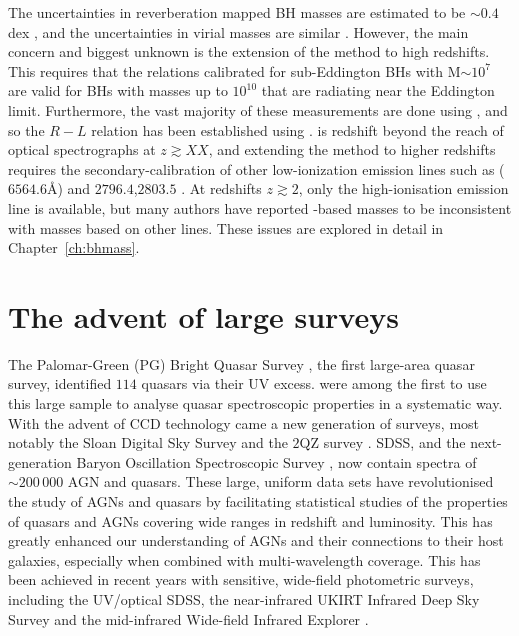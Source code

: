 The uncertainties in reverberation mapped BH masses are estimated to be $\sim 0.4$ dex \citep[e.g.][]{peterson10}, and the uncertainties in virial masses are similar \citep[e.g.][]{vestergaard06}.
However, the main concern and biggest unknown is the extension of the method to high redshifts. 
This requires that the relations calibrated for sub-Eddington BHs with M$\sim10^7$ are valid for BHs with masses up to $10^{10}$ that are radiating near the Eddington limit. 
Furthermore, the vast majority of these measurements are done using \hbns, and so the $R-L$ relation has been established using \hbns.
\hb is redshift beyond the reach of optical spectrographs at $z \gtrsim XX$, and extending the method to higher redshifts requires the secondary-calibration of other low-ionization emission lines such as \ha ($6564.6$\AA) and \ll$2796.4$,$2803.5$ \citep[e.g.][]{vestergaard02,mclure02,wu04,kollmeier06,onken08,wang09,rafiee11}.
At redshifts $z \gtrsim 2$, only the high-ionisation  emission line is available, but many authors have reported -based masses to be inconsistent with masses based on other lines. 
These issues are explored in detail in Chapter~\ref{ch:bhmass}.

\section{The advent of large surveys}

The Palomar-Green (PG) Bright Quasar Survey \citep[BQS;][]{schmidt83}, the first large-area quasar survey, identified $114$ quasars via their UV excess. 
\citet{boroson92} were among the first to use this large sample to analyse quasar spectroscopic properties in a systematic way.
With the advent of CCD technology came a new generation of surveys, most notably the Sloan Digital Sky Survey \citep[SDSS;][]{york00} and the $2$QZ survey \citep{croom04}. 
SDSS, and the next-generation Baryon Oscillation Spectroscopic Survey \citep[BOSS;][]{dawson13}, now contain spectra of $\sim200\,000$ AGN and quasars. 
These large, uniform data sets have revolutionised the study of AGNs and quasars by facilitating statistical studies of the properties of quasars and AGNs covering wide ranges in redshift and luminosity. 
This has greatly enhanced our understanding of AGNs and their connections to their host galaxies, especially when combined with multi-wavelength coverage. 
This has been achieved in recent years with sensitive, wide-field photometric surveys, including the UV/optical SDSS, the near-infrared UKIRT Infrared Deep Sky Survey \citep[UKIDSS;][]{lawrence07} and the mid-infrared Wide-field Infrared Explorer \citep[WISE;][]{wright10}.  

